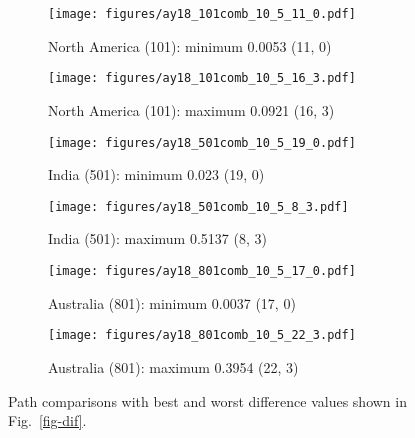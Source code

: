 \begin{figure*}
	\centering
	\begin{subfigure}{.42\textwidth} %
		\texttt{[image: figures/ay18\_101comb\_10\_5\_11\_0.pdf]}
		\caption{North America (101): minimum 0.0053 (11, 0)}\label{fig-nac-105110} %
	\end{subfigure}
	\begin{subfigure}{.42\textwidth} %
		\texttt{[image: figures/ay18\_101comb\_10\_5\_16\_3.pdf]}
		\caption{North America (101): maximum 0.0921 (16, 3)}\label{fig-nac-105163} %
	\end{subfigure}
	\vspace{.1em} %
	\begin{subfigure}{.42\textwidth}
		\texttt{[image: figures/ay18\_501comb\_10\_5\_19\_0.pdf]}
		\caption{India (501): minimum 0.023 (19, 0)}\label{fig-ind-105190}
	\end{subfigure}
	\begin{subfigure}{.42\textwidth}
		\texttt{[image: figures/ay18\_501comb\_10\_5\_8\_3.pdf]}
		\caption{India (501): maximum 0.5137 (8, 3)}\label{fig-ind-10583}
	\end{subfigure}
	\vspace{.1em}
	\begin{subfigure}{.42\textwidth}
		\texttt{[image: figures/ay18\_801comb\_10\_5\_17\_0.pdf]}
		\caption{Australia (801): minimum 0.0037 (17, 0)}\label{fig-au-105170}
	\end{subfigure}
	\begin{subfigure}{.42\textwidth}
		\texttt{[image: figures/ay18\_801comb\_10\_5\_22\_3.pdf]}
		\caption{Australia (801): maximum 0.3954 (22, 3)}\label{fig-au-105223}
	\end{subfigure}
	\caption[Best and worst differences with test (10 Myr bin, 5 Myr
step)]{Path comparisons with best and worst difference values shown in
Fig.~\ref{fig-dif}.}\label{fig-difbw}
\end{figure*}

